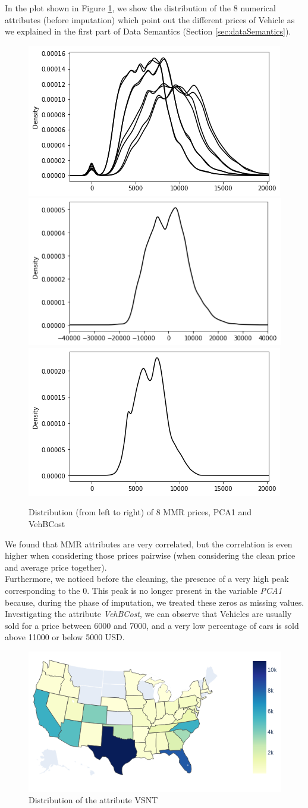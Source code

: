 \documentclass{article}
\begin{document}
	In the plot shown in Figure \ref{fig:mmr}, we show the distribution of the 8 numerical attributes (before imputation) which point out the different prices of Vehicle as we explained in the first part of Data Semantics (Section \ref{sec:dataSemantics}). 
	\begin{figure}[H]
		\centering
		\includegraphics[width=.32\textwidth]{index}\hfill
		\includegraphics[width=.32\textwidth]{PCA1} \hfill
		\includegraphics[width=.32\textwidth]{vehbcostNoTitle}\hfill
		\caption{Distribution (from left to right) of 8 MMR prices, PCA1 and VehBCost}
		\label{fig:mmr}
	\end{figure}
	
	We found that MMR attributes are very correlated, but the correlation is even higher when considering those prices pairwise (when considering the clean price and average price together).\\
	Furthermore, we noticed before the cleaning, the presence of a very high peak corresponding to the 0. This peak is no longer present in the variable \emph{PCA1} because, during the phase of imputation, we treated these zeros as missing values. Investigating the attribute \emph{VehBCost}, we can observe that Vehicles are usually sold for a price between 6000 and 7000, and a very low percentage of cars is sold above 11000 or below 5000 USD.
	
	
	
	\begin{figure}[H]
		\centering
		\includegraphics[width=.65\textwidth]{newplot.png}
		\caption{{ Distribution of the attribute VSNT}}
	\end{figure}
	
\end{document}

